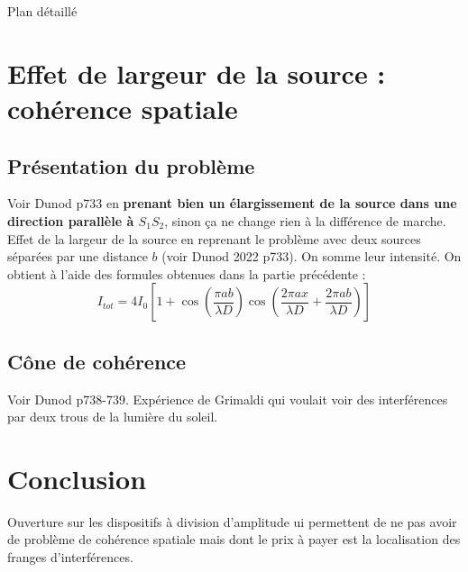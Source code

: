 \begin{reportBlock}{Plan détaillé}
\section{Effet de largeur de la source : cohérence spatiale}
\subsection{Présentation du problème}
Voir Dunod p733 en \textbf{prenant bien un élargissement de la source dans une direction parallèle à $S_1S_2$}, sinon ça ne change rien à la différence de marche. Effet de la largeur de la source en reprenant le problème avec deux sources séparées par une distance $b$ (voir Dunod 2022 p733). On somme leur intensité. On obtient à l'aide des formules obtenues dans la partie précédente : 
\begin{equation}
    I_{tot} = 4I_0\left[1+\cos\left(\frac{\pi ab}{\lambda D}\right)\cos\left(\frac{2\pi a x}{\lambda D}+\frac{2\pi a b}{\lambda D}\right)\right]
\end{equation}
\subsection{Cône de cohérence}
Voir Dunod p738-739. Expérience de Grimaldi qui voulait voir des interférences par deux trous de la lumière du soleil.
\section{Conclusion}
Ouverture sur les dispositifs à division d'amplitude ui permettent de ne pas avoir de problème de cohérence spatiale mais dont le prix à payer est la localisation des franges d'interférences.
\end{reportBlock}


